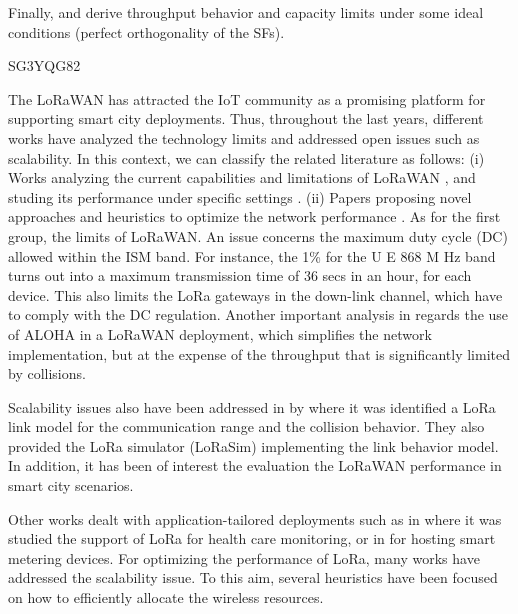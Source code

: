 
Finally,
	\cite{reynders_power_2017} and \cite{magrin_performance_2017} derive throughput behavior and capacity limits under some ideal conditions (perfect orthogonality of the SFs).

\cite{cuomo_towards_2018} SG3YQG82

The LoRaWAN has attracted the IoT community as a promising platform for supporting smart city deployments.
Thus,
	throughout the last years,
	different works have analyzed the technology limits and addressed open issues such as scalability.
In this context,
	we can classify the related literature as follows:
	(i) Works analyzing the current capabilities and limitations of LoRaWAN \cite{adelantado_understanding_2017}\cite{petajajarvi_performance_2017}\cite{georgiou_low_2017}\cite{bor_lora_2016},
	and studing its performance under specific settings \cite{magrin_performance_2017}\cite{petajajarvi_evaluation_2017}\cite{varsier_capacity_2017}.
(ii) Papers proposing novel approaches and heuristics to optimize the network performance \cite{bor_lora_nodate}\cite{reynders_power_2017}\cite{abdelfadeel_fair_2018}\cite{sartori_enabling_2017}\cite{cuomo_explora_2017}.
As for the first group,
	\citet{adelantado_understanding_2017} the limits of LoRaWAN.
An issue concerns the maximum duty cycle (DC) allowed within the ISM band.
For instance,
	the 1\% for the U E 868 M Hz band turns out into a maximum
transmission time of 36 secs in an hour,
	for each device.
This also limits the LoRa gateways in the down-link channel,
	which have to comply with the DC regulation.
Another important analysis in \cite{adelantado_understanding_2017} regards the use of ALOHA in a LoRaWAN deployment,
	which simplifies the network implementation,
	but at the expense of the throughput that is significantly limited by collisions.


Scalability issues also have been addressed in by \citet{bor_lora_2016} where it was identified a LoRa link model for the communication range and the collision behavior.
They also provided the LoRa simulator (LoRaSim) implementing the link behavior model.
In addition,
	it has been of interest the evaluation the LoRaWAN performance in smart city scenarios.

Other works dealt with application-tailored deployments such as in \cite{petajajarvi_evaluation_2017} where it was studied the support of LoRa for health care monitoring,
	or in \cite{varsier_capacity_2017} for hosting smart metering devices.
For optimizing the performance of LoRa,
	many works have addressed the scalability issue.
To this aim,
	several heuristics have been focused on how to efficiently allocate the wireless resources.


